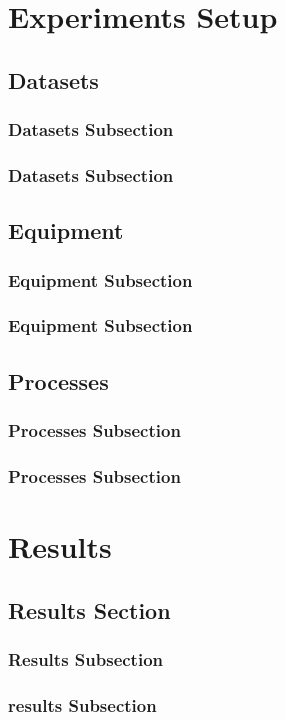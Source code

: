 \documentclass[a4paper,twoside,12pt]{book}
\begin{document}
		\chapter{Experiments Setup} 
			\section{Datasets}
				\subsection{Datasets Subsection}
				\subsection{Datasets Subsection}
			\section{Equipment}
				\subsection{Equipment Subsection}
				\subsection{Equipment Subsection}
			\section{Processes}
				\subsection{Processes Subsection}
				\subsection{Processes Subsection}
		\chapter{Results} 
			\section{Results Section}
				\subsection{Results Subsection}
				\subsection{results Subsection}
\end{document}
